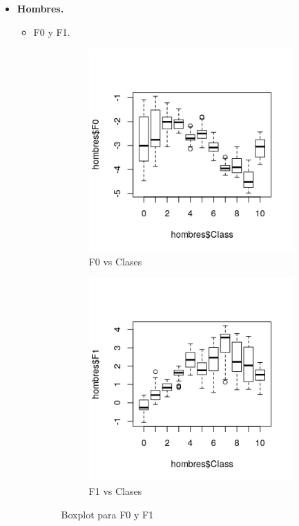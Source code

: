 \begin{itemize}
	\item \textbf{Hombres.}
	\begin{itemize}
		\item F0 y F1.
		
		\begin{figure}[H]
			\centering
			\begin{subfigure}{.5\textwidth}
				\centering
				\includegraphics[width=.9\linewidth]{bphF0.png}
				\caption{F0 vs Clases}
				\label{fig:bphF0}
			\end{subfigure}%
			\begin{subfigure}{.5\textwidth}
				\centering
				\includegraphics[width=.9\linewidth]{bphF1.png}
				\caption{F1 vs Clases}
				\label{fig:bphF1}
			\end{subfigure}
			\caption{Boxplot para F0 y F1}
			\label{fig:bph01}
		\end{figure}
	\end{itemize}
	

\end{itemize}
